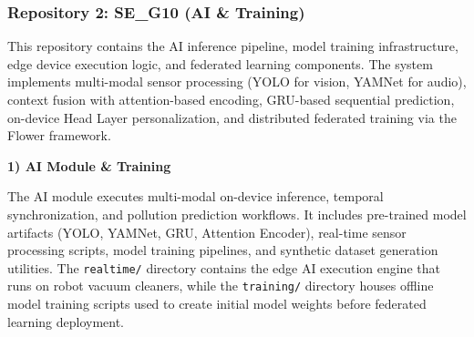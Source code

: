 \documentclass[conference]{IEEEtran}
\begin{document}
\subsubsection{Repository 2: SE\_G10 (AI \& Training)}

This repository contains the AI inference pipeline, model training infrastructure, edge device execution logic, and federated learning components. The system implements multi-modal sensor processing (YOLO for vision, YAMNet for audio), context fusion with attention-based encoding, GRU-based sequential prediction, on-device Head Layer personalization, and distributed federated training via the Flower framework.

\textbf{1) AI Module \& Training}

The AI module executes multi-modal on-device inference, temporal synchronization, and pollution prediction workflows. It includes pre-trained model artifacts (YOLO, YAMNet, GRU, Attention Encoder), real-time sensor processing scripts, model training pipelines, and synthetic dataset generation utilities. The \texttt{realtime/} directory contains the edge AI execution engine that runs on robot vacuum cleaners, while the \texttt{training/} directory houses offline model training scripts used to create initial model weights before federated learning deployment.
\end{document}
